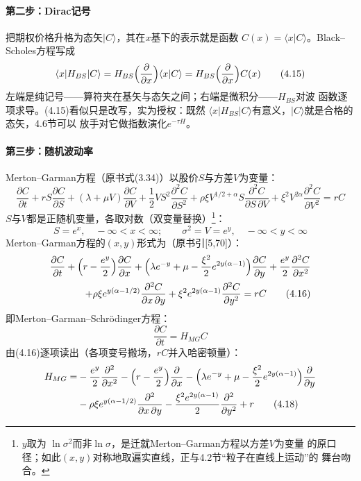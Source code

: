 \paragraph{第二步：Dirac记号}
把期权价格升格为态矢$|C\rangle$，其在$x$基下的表示就是函数
$C(x)=\langle x|C\rangle$。Black--Scholes方程写成
\begin{equation*}
\langle x|H_{BS}|C\rangle
=H_{BS}\Bigl(\frac{\partial}{\partial x}\Bigr)\langle x|C\rangle
=H_{BS}\Bigl(\frac{\partial}{\partial x}\Bigr)C(x)
\tag{4.15}
\end{equation*}
左端是纯记号——算符夹在基矢与态矢之间；右端是微积分——$H_{BS}$对波
函数逐项求导。(4.15)看似只是改写，实为授权：既然
$\langle x|H_{BS}|C\rangle$有意义，$|C\rangle$就是合格的态矢，4.6节可以
放手对它做指数演化$e^{-\tau H}$。

\paragraph{第三步：随机波动率}
Merton--Garman方程（原书式(3.34)）以股价$S$与方差$V$为变量：
\begin{equation*}
\frac{\partial C}{\partial t}
+rS\frac{\partial C}{\partial S}
+(\lambda+\mu V)\frac{\partial C}{\partial V}
+\frac{1}{2}VS^{2}\frac{\partial^{2}C}{\partial S^{2}}
+\rho\xi V^{1/2+\alpha}S\frac{\partial^{2}C}{\partial S\,\partial V}
+\xi^{2}V^{2\alpha}\frac{\partial^{2}C}{\partial V^{2}}
=rC
\end{equation*}
$S$与$V$都是正随机变量，各取对数（双变量替换）\footnote{$y$取为
$\ln\sigma^{2}$而非$\ln\sigma$，是迁就Merton--Garman方程以方差$V$为变量
的原口径；如此$(x,y)$对称地取遍实直线，正与4.2节“粒子在直线上运动”的
舞台吻合。}：
\begin{equation*}
S=e^{x},\quad -\infty<x<\infty;\qquad
\sigma^{2}=V=e^{y},\quad -\infty<y<\infty
\end{equation*}
Merton--Garman方程的$(x,y)$形式为（原书引[5,70]）：
\begin{align*}
\frac{\partial C}{\partial t}
+\Bigl(r-\frac{e^{y}}{2}\Bigr)\frac{\partial C}{\partial x}
+\Bigl(\lambda e^{-y}+\mu-\frac{\xi^{2}}{2}e^{2y(\alpha-1)}\Bigr)
\frac{\partial C}{\partial y}
+\frac{e^{y}}{2}\frac{\partial^{2}C}{\partial x^{2}}\notag\\
+\rho\xi e^{y(\alpha-1/2)}\frac{\partial^{2}C}{\partial x\,\partial y}
+\xi^{2}e^{2y(\alpha-1)}\frac{\partial^{2}C}{\partial y^{2}}
=rC
\tag{4.16}
\end{align*}
即Merton--Garman--Schr\"odinger方程：
\begin{equation*}
\frac{\partial C}{\partial t}=H_{MG}C
\tag{4.17}
\end{equation*}
由(4.16)逐项读出（各项变号搬场，$rC$并入哈密顿量）：
\begin{align*}
H_{MG}=&-\frac{e^{y}}{2}\frac{\partial^{2}}{\partial x^{2}}
-\Bigl(r-\frac{e^{y}}{2}\Bigr)\frac{\partial}{\partial x}
-\Bigl(\lambda e^{-y}+\mu-\frac{\xi^{2}}{2}e^{2y(\alpha-1)}\Bigr)
\frac{\partial}{\partial y}\\
&-\rho\xi e^{y(\alpha-1/2)}\frac{\partial^{2}}{\partial x\,\partial y}
-\frac{\xi^{2}e^{2y(\alpha-1)}}{2}\frac{\partial^{2}}{\partial y^{2}}
+r
\tag{4.18}
\end{align*}

